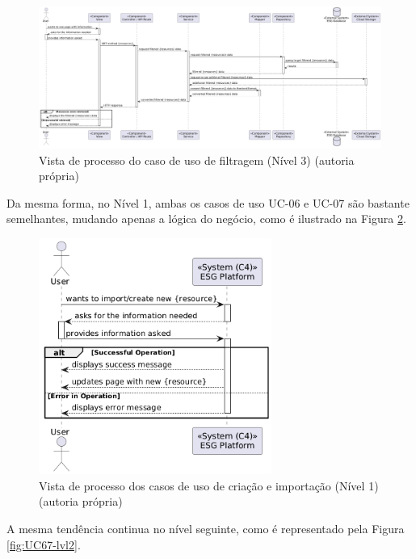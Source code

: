 \begin{figure}[H]
\centering
\includegraphics[width=\linewidth]{frontmatter/assets/diagrams/Process Views/LVL3/uc-02-lvl3.png}
\caption{Vista de processo do caso de uso de filtragem (Nível 3) (autoria própria)}
\label{fig:UC2-lvl3}
\end{figure}

Da mesma forma, no Nível 1, ambas os casos de uso UC-06 e UC-07 são bastante semelhantes, mudando apenas a lógica do negócio, como é ilustrado na Figura \ref{fig:UC67-lvl1}.

\begin{figure}[H]
\centering
\includegraphics[width=3in]{frontmatter/assets/diagrams/Process Views/UC67-lvl1.png}
\caption{Vista de processo dos casos de uso de criação e importação (Nível 1) (autoria própria)}
\label{fig:UC67-lvl1}
\end{figure}

A mesma tendência continua no nível seguinte, como é representado pela Figura \ref{fig:UC67-lvl2}.

